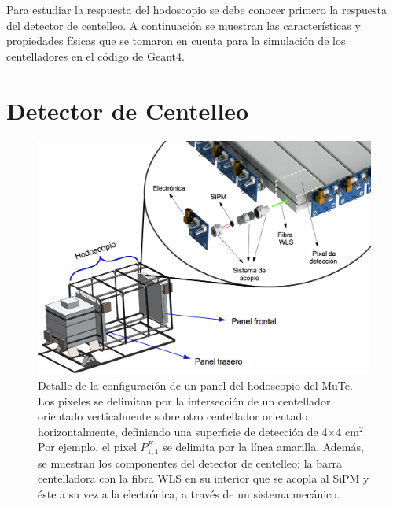 \documentclass[12pt,oneside,openany,letter]{book}
\begin{document}
Para estudiar la respuesta del hodoscopio se debe conocer primero la respuesta del detector de centelleo. A continuaci\'on se muestran las características y propiedades físicas que se tomaron en cuenta para la simulación de los centelladores en el código de Geant4.



\section{Detector de Centelleo}
\begin{figure}[h!]
    \centering       
    \includegraphics[scale=0.5]{images/hodoscopio.png}
   \caption[Detalle de la configuración de un panel del hodoscopio del MuTe]{Detalle de la configuración de un panel del hodoscopio del MuTe. Los pixeles se delimitan por la intersecci\'on de un centellador orientado verticalmente sobre otro centellador orientado horizontalmente, definiendo una superficie de detecci\'on de 4$\times$4 cm$^{2}$. Por ejemplo, el pixel $P^{F}_{1,1}$ se delimita por la línea amarilla. Además, se muestran los componentes del detector de centelleo: la barra centelladora con la fibra WLS en su interior que se acopla al SiPM y éste a su vez a la electrónica, a través de un sistema mecánico.}\label{panel_desc}
\end{figure}
\end{document}
